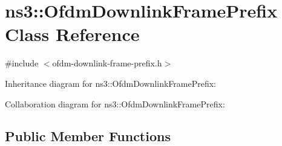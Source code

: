\hypertarget{classns3_1_1OfdmDownlinkFramePrefix}{}\section{ns3\+:\+:Ofdm\+Downlink\+Frame\+Prefix Class Reference}
\label{classns3_1_1OfdmDownlinkFramePrefix}


{\ttfamily \#include $<$ofdm-\/downlink-\/frame-\/prefix.\+h$>$}



Inheritance diagram for ns3\+:\+:Ofdm\+Downlink\+Frame\+Prefix\+:


Collaboration diagram for ns3\+:\+:Ofdm\+Downlink\+Frame\+Prefix\+:
\subsection*{Public Member Functions}
